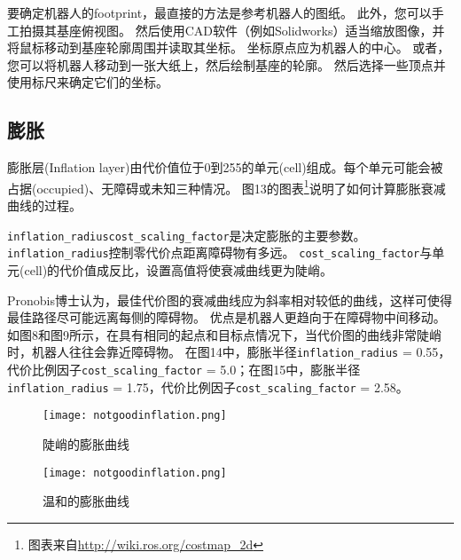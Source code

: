 要确定机器人的footprint，最直接的方法是参考机器人的图纸。 
此外，您可以手工拍摄其基座俯视图。 然后使用CAD软件（例如Solidworks）适当缩放图像，并将鼠标移动到基座轮廓周围并读取其坐标。 
坐标原点应为机器人的中心。 
或者，您可以将机器人移动到一张大纸上，然后绘制基座的轮廓。 然后选择一些顶点并使用标尺来确定它们的坐标。

\subsection[inflation]{膨胀}%
膨胀层(Inflation layer)由代价值位于0到255的单元(cell)组成。每个单元可能会被占据(occupied)、无障碍或未知三种情况。
图13的图表\footnote{图表来自\url{http://wiki.ros.org/costmap_2d}}说明了如何计算膨胀衰减曲线的过程。

\texttt{inflation_radius}\texttt{cost_scaling_factor}是决定膨胀的主要参数。
\texttt{inflation_radius}控制零代价点距离障碍物有多远。
\texttt{cost_scaling_factor}与单元(cell)的代价值成反比，设置高值将使衰减曲线更为陡峭。

Pronobis博士认为，最佳代价图的衰减曲线应为斜率相对较低的曲线，这样可使得最佳路径尽可能远离每侧的障碍物。
优点是机器人更趋向于在障碍物中间移动。
如图8和图9所示，在具有相同的起点和目标点情况下，当代价图的曲线非常陡峭时，机器人往往会靠近障碍物。
在图14中，膨胀半径\texttt{inflation_radius} = 0.55，代价比例因子\texttt{cost_scaling_factor} = 5.0；在图15中，膨胀半径\texttt{inflation_radius} = 1.75，代价比例因子\texttt{cost_scaling_factor} = 2.58。


\begin{figure}[!htb]
	\begin{minipage}[t]{0.49\linewidth}
		\centering 
		\texttt{[image: notgoodinflation.png]} 
		\caption{陡峭的膨胀曲线} 
		\label{fig:side:a} 
	\end{minipage}%
	\begin{minipage}[t]{0.49\linewidth} 
		\centering 
		\texttt{[image: notgoodinflation.png]} 
		\caption{温和的膨胀曲线} 
		\label{fig:side:b} 
	\end{minipage} 
\end{figure}

